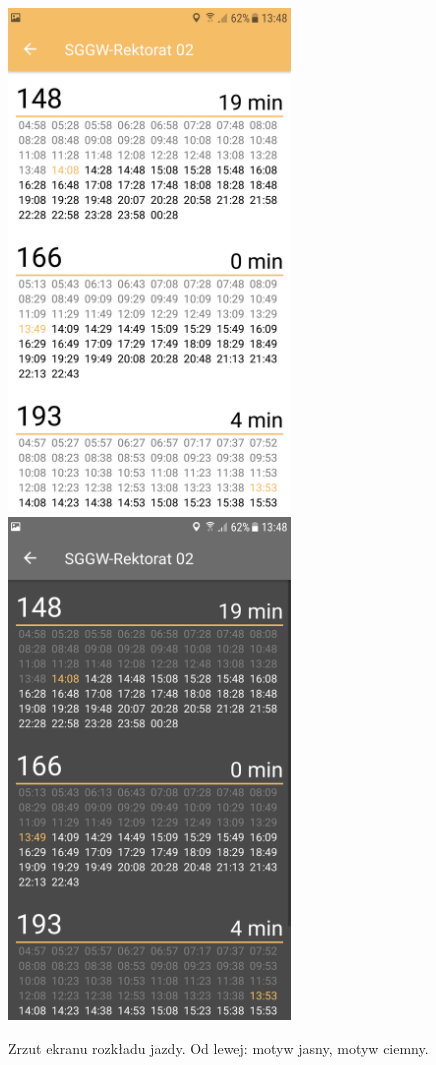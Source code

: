\documentclass{SGGW-thesis}
\begin{document}
\begin{figure}
  \centering
  \includegraphics[width=75mm]{screeny/rozklad_jasny}
  \enspace
  \includegraphics[width=75mm]{screeny/rozklad_ciemny}
  \caption[Rozkład jazdy]{
    \label{screen.rozklad_jazdy}
    Zrzut ekranu rozkładu jazdy. Od lewej: motyw jasny, motyw ciemny. \vspace{2ex}
  }
\end{figure}
\end{document}
